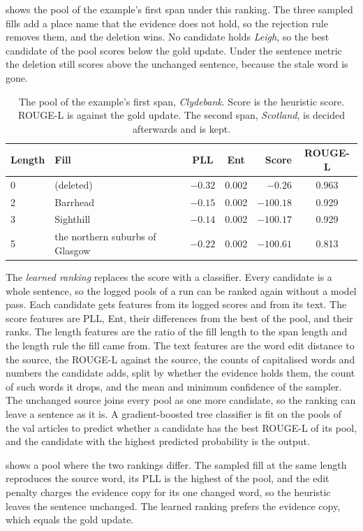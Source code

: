 \documentclass[]{paper}
\begin{document}
 shows the pool of the example's first span under this ranking. The three sampled fills add a place name that the evidence does not hold, so the rejection rule removes them, and the deletion wins. No candidate holds \emph{Leigh}, so the best candidate of the pool scores below the gold update. Under the sentence metric the deletion still scores above the unchanged sentence, because the stale word is gone.

\begin{table}[H]
\caption{The pool of the example's first span, \emph{Clydebank}. Score is the heuristic score. ROUGE-L is against the gold update. The second span, \emph{Scotland}, is decided afterwards and is kept.}
\label{tab:example}
\centering
\footnotesize
\begin{tabular}{llccrc}
\toprule
Length & Fill & PLL & Ent & Score & ROUGE-L \\
\midrule
0 & (deleted) & $-0.32$ & 0.002 & $-0.26$ & 0.963 \\
2 & Barrhead & $-0.15$ & 0.002 & $-100.18$ & 0.929 \\
3 & Sighthill & $-0.14$ & 0.002 & $-100.17$ & 0.929 \\
5 & the northern suburbs of Glasgow & $-0.22$ & 0.002 & $-100.61$ & 0.813 \\
\bottomrule
\end{tabular}
\end{table}

The \emph{learned ranking} replaces the score with a classifier. Every candidate is a whole sentence, so the logged pools of a run can be ranked again without a model pass. Each candidate gets features from its logged scores and from its text. The score features are PLL, Ent, their differences from the best of the pool, and their ranks. The length features are the ratio of the fill length to the span length and the length rule the fill came from. The text features are the word edit distance to the source, the ROUGE-L against the source, the counts of capitalised words and numbers the candidate adds, split by whether the evidence holds them, the count of such words it drops, and the mean and minimum confidence of the sampler. The unchanged source joins every pool as one more candidate, so the ranking can leave a sentence as it is. A gradient-boosted tree classifier is fit on the pools of the val articles to predict whether a candidate has the best ROUGE-L of its pool, and the candidate with the highest predicted probability is the output.

 shows a pool where the two rankings differ. The sampled fill at the same length reproduces the source word, its PLL is the highest of the pool, and the edit penalty charges the evidence copy for its one changed word, so the heuristic leaves the sentence unchanged. The learned ranking prefers the evidence copy, which equals the gold update.
\end{document}
